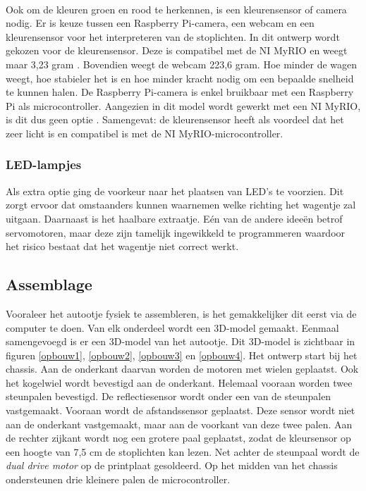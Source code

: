 \documentclass[a4paper,twoside,kulak]{kulakreport} %
\begin{document}
~

Ook om de kleuren groen en rood te herkennen, is een kleurensensor of camera nodig. Er is keuze tussen een Raspberry Pi-camera, een webcam en een kleurensensor voor het interpreteren van de stoplichten. In dit ontwerp wordt gekozen voor de kleurensensor. Deze is compatibel met de NI MyRIO en weegt maar 3,23 gram \cite{Webcam,TCS34725KleurSensorBOB}. Bovendien weegt de webcam 223,6 gram. Hoe minder de wagen weegt, hoe stabieler het is en hoe minder kracht nodig om een bepaalde snelheid te kunnen halen. De Raspberry Pi-camera is enkel bruikbaar met een Raspberry Pi als microcontroller. Aangezien in dit model wordt gewerkt met een NI MyRIO, is dit dus geen optie \cite{RPi-camera}. Samengevat: de kleurensensor heeft als voordeel dat het zeer licht is en compatibel is met de NI MyRIO-microcontroller. %



\subsubsection{LED-lampjes}\label{LED-lampjes}
Als extra optie ging de voorkeur naar het plaatsen van LED's te voorzien. Dit zorgt ervoor dat omstaanders kunnen waarnemen welke richting het wagentje zal uitgaan. Daarnaast is het haalbare extraatje. Eén van de andere ideeën betrof servomotoren, maar deze zijn tamelijk ingewikkeld te programmeren waardoor het risico bestaat dat het wagentje niet correct werkt.


\subsection{Assemblage}\label{Assemblage}
Vooraleer het autootje fysiek te assembleren, is het gemakkelijker dit eerst via de computer te doen. Van elk onderdeel wordt een 3D-model gemaakt. Eenmaal samengevoegd is er een 3D-model van het autootje. Dit 3D-model is zichtbaar in figuren \ref{opbouw1}, \ref{opbouw2}, \ref{opbouw3} en \ref{opbouw4}.
Het ontwerp start bij het chassis. Aan de onderkant daarvan worden de motoren met wielen  geplaatst. Ook het kogelwiel wordt bevestigd aan de onderkant. Helemaal vooraan worden twee steunpalen bevestigd. De reflectiesensor wordt onder een van de steunpalen vastgemaakt. Vooraan wordt de afstandssensor geplaatst. Deze sensor wordt niet aan de onderkant vastgemaakt, maar aan de voorkant van deze twee palen. Aan de rechter zijkant wordt nog een grotere paal geplaatst, zodat de kleursensor op een hoogte van 7,5 cm de stoplichten kan lezen. Net achter de steunpaal wordt de {\it dual drive motor} op de printplaat gesoldeerd. Op het midden van het chassis ondersteunen drie kleinere palen de microcontroller. 
\end{document}

